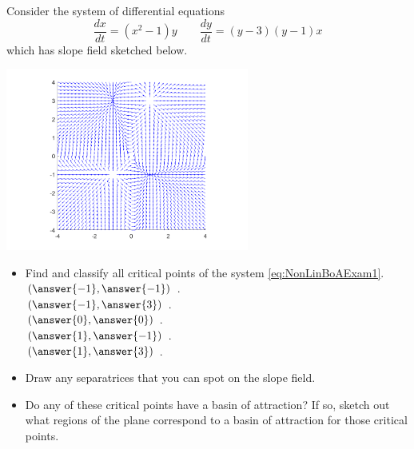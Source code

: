 \documentclass{ximera}
\begin{document}
\begin{exercise} 
    Consider the system of differential equations
    \begin{equation}
        \frac{dx}{dt} = (x^2 - 1)y \qquad \frac{dy}{dt} = (y-3)(y-1)x \label{eq:NonLinBoAExam1}
    \end{equation}
    which has slope field sketched below.
    \begin{center}
        \includegraphics[width=0.6\textwidth]{../figures/NLBoA_Ex1.png}
    \end{center}
    \begin{itemize}
        \item Find and classify all critical points of the system \eqref{eq:NonLinBoAExam1}.
            $\left(\answer{-1}, \answer{-1}\right)$  . \\
            $\left(\answer{-1}, \answer{3}\right)$  . \\
            $\left(\answer{0}, \answer{0}\right)$  . \\
            $\left(\answer{1}, \answer{-1}\right)$  . \\
            $\left(\answer{1}, \answer{3}\right)$  . \\
        \item Draw any separatrices that you can spot on the slope field.
        \item Do any of these critical points have a basin of attraction? If so, sketch out what regions of the plane correspond to a basin of attraction for those critical points. 
    \end{itemize}
\end{exercise}
\end{document}
